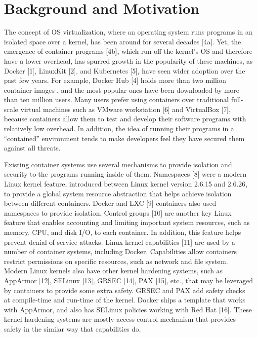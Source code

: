 \section{Background and Motivation}
\label{sec.motivation}
The concept of OS virtualization, where an operating system runs programs in an isolated space over a kernel, has been around for several decades [4a]. 
Yet,  the emergence of container programs [4b], which run off the kernel's OS and therefore have a lower overhead, 
has spurred  growth in the popularity of these machines, as  Docker [1], LinuxKit [2], and Kubernetes [5], have seen wider adoption over the past few years. 
For example, Docker Hub [4] holds more than two million container images , and the most popular ones have been downloaded by more than ten million users. 
Many users prefer using containers over traditional full-scale virtual machines such as VMware workstation [6] and VirtualBox [7], 
because containers allow them to test and develop their software programs with relatively low overhead. 
In addition, the idea of running their programs in a ``contained'' environment tends to make developers feel they have secured them against all threats. 

Existing container systems use several mechanisms to provide isolation and security to the programs running inside of them. 
Namespaces [8] were a modern Linux kernel feature, introduced between Linux kernel version 2.6.15 and 2.6.26, to provide a global system resource abstraction 
that helps achieve isolation between different containers. Docker and LXC [9] containers also used namespaces to provide isolation. 
Control groups [10] are another key Linux feature that enables accounting and limiting important system resources, such as memory, CPU, and disk I/O, to each container.  
In addition, this feature helps prevent denial-of-service attacks. Linux kernel capabilities [11] are used by a number of container systems, including Docker. 
Capabilities allow containers restrict permissions on specific resources, such as network and file system. 
Modern Linux kernels also have other kernel hardening systems, such as AppArmor [12], SELinux [13], GRSEC [14], PAX [15], etc., 
that may be leveraged by containers to provide some extra safety. GRSEC and PAX add safety checks at compile-time and run-time of the kernel. 
Docker ships a template that works with AppArmor, and also has SELinux policies working with Red Hat [16]. 
These kernel hardening systems are mostly access control mechanism that provides safety in the similar way that capabilities do.

